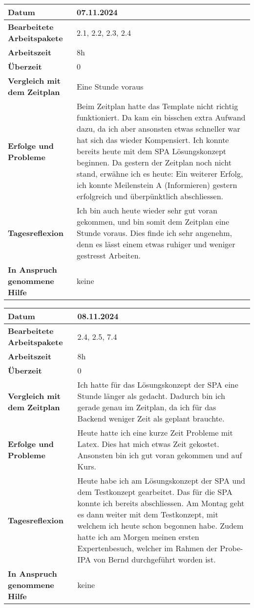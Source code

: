 \begin{longtable}{p{}|p{}}
	\hline
	\textbf{Datum}                       & 07.11.2024 \\
	\hline
	\textbf{Bearbeitete Arbeitspakete}   & 2.1, 2.2, 2.3, 2.4 \\
	\hline
	\textbf{Arbeitszeit}                 & 8h \\
	\hline
	\textbf{Überzeit}                    & 0 \\
	\hline
	\textbf{Vergleich mit dem Zeitplan}  & Eine Stunde voraus \\
	\hline
	\textbf{Erfolge und Probleme}        & Beim Zeitplan hatte das Template nicht richtig funktioniert. Da kam ein bisschen extra Aufwand dazu, da ich aber ansonsten etwas schneller war hat sich das wieder Kompensiert. Ich konnte bereits heute mit dem SPA Lösungskonzept beginnen. Da gestern der Zeitplan noch nicht stand, erwähne ich es heute: Ein weiterer Erfolg, ich konnte
Meilenstein A (Informieren)	gestern erfolgreich und überpünktlich abschliessen.\\
	\hline
	\textbf{Tagesreflexion}              & Ich bin auch heute wieder sehr gut voran gekommen, und bin somit dem Zeitplan eine Stunde voraus. Dies finde ich sehr angenehm, denn es lässt einem etwas ruhiger und weniger gestresst Arbeiten.\\
	\hline
	\textbf{In Anspruch genommene Hilfe} & keine\\
	\hline
\end{longtable}\label{tab:arbeitsprotokoll-tag2}

\newpage

\begin{longtable}{p{}|p{}}
	\hline
	\textbf{Datum}                       & 08.11.2024 \\
	\hline
	\textbf{Bearbeitete Arbeitspakete}   & 2.4, 2.5, 7.4 \\
	\hline
	\textbf{Arbeitszeit}                 & 8h \\
	\hline
	\textbf{Überzeit}                    & 0 \\
	\hline
	\textbf{Vergleich mit dem Zeitplan}  & Ich hatte für das Lösungskonzept der SPA eine Stunde länger als gedacht. Dadurch bin ich gerade genau im Zeitplan, da ich für das Backend weniger Zeit als geplant brauchte. \\
	\hline
	\textbf{Erfolge und Probleme}        & Heute hatte ich eine kurze Zeit Probleme mit Latex. Dies hat mich etwas Zeit gekostet. Ansonsten bin ich gut voran gekommen und auf Kurs.
	\\
	\hline
	\textbf{Tagesreflexion}              & Heute habe ich am Lösungskonzept der SPA und dem Testkonzept gearbeitet. Das für die SPA konnte ich bereits abschliessen. Am Montag geht es dann weiter mit dem Testkonzept, mit welchem ich heute schon begonnen habe. Zudem hatte ich am Morgen meinen ersten Expertenbesuch, welcher im Rahmen der Probe-IPA von Bernd durchgeführt worden ist.
	\\
	\hline
	\textbf{In Anspruch genommene Hilfe} & keine \\
	\hline
\end{longtable}\label{tab:arbeitsprotokoll-tag3}
\newpage

